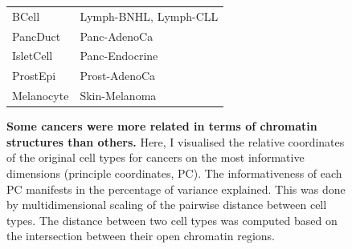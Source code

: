 \begin{figure}[ht!]
\begin{minipage}[c]{\textwidth}
\begin{tabulary}{\textwidth}{ ll }
    BCell & Lymph-BNHL, Lymph-CLL \\
    
    PancDuct & Panc-AdenoCa \\
    
    IsletCell & Panc-Endocrine \\
    
    ProstEpi & Prost-AdenoCa \\
    
    Melanocyte & Skin-Melanoma \\
    \bottomrule
    
    \end{tabulary}
    
  \end{minipage}\hfill
  \vspace{0.9cm}
  
  \begin{minipage}[c]{\textwidth}
    \caption{
      \textbf{Some cancers were more related in terms of chromatin structures than others.} Here, I visualised the relative coordinates of the original cell types for cancers on the most informative dimensions (principle coordinates, PC). The informativeness of each PC manifests in the percentage of variance explained. This was done by multidimensional scaling of the pairwise distance between cell types. The distance between two cell types was computed based on the intersection between their open chromatin regions. 
    } \label{fig:encode_pca}
  \end{minipage}
\end{figure}
